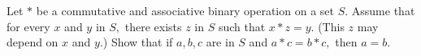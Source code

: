 Let $*$ be a commutative and associative binary operation on a set $S.$ Assume that for every $x$ and $y$ in $S,$ there exists $z$ in $S$ such that $x*z=y.$ (This $z$ may depend on $x$ and $y.$) Show that if $a,b,c$ are in $S$ and $a*c=b*c,$ then $a=b.$